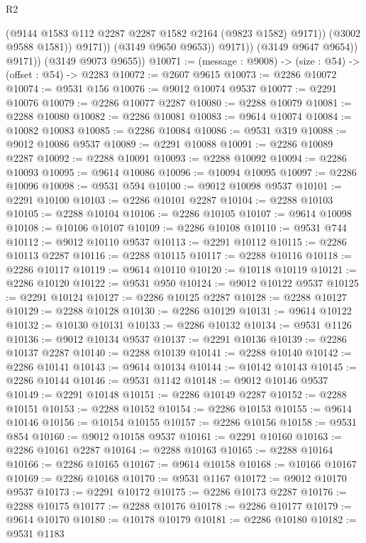 \begin{lexlean}{R2}
\begin{coremodule}
                          (@9144 @1583 @112 @2287 @2287 @1582 @2164 (@9823 @1582) @9171))
                        (@3002 @9588 @1581))
                      @9171))
                  (@3149 @9650 @9653))
                @9171))
            (@3149 @9647 @9654))
          @9171))
      (@3149 @9073 @9655))
@10071 := (message : @9008) -> (size : @54) -> (offset : @54) -> @2283
@10072 := @2607 @9615
@10073 := @2286 @10072
@10074 := @9531 @156
@10076 := @9012 @10074 @9537
@10077 := @2291 @10076
@10079 := @2286 @10077 @2287
@10080 := @2288 @10079
@10081 := @2288 @10080
@10082 := @2286 @10081
@10083 := @9614 @10074
@10084 := @10082 @10083
@10085 := @2286 @10084
@10086 := @9531 @319
@10088 := @9012 @10086 @9537
@10089 := @2291 @10088
@10091 := @2286 @10089 @2287
@10092 := @2288 @10091
@10093 := @2288 @10092
@10094 := @2286 @10093
@10095 := @9614 @10086
@10096 := @10094 @10095
@10097 := @2286 @10096
@10098 := @9531 @594
@10100 := @9012 @10098 @9537
@10101 := @2291 @10100
@10103 := @2286 @10101 @2287
@10104 := @2288 @10103
@10105 := @2288 @10104
@10106 := @2286 @10105
@10107 := @9614 @10098
@10108 := @10106 @10107
@10109 := @2286 @10108
@10110 := @9531 @744
@10112 := @9012 @10110 @9537
@10113 := @2291 @10112
@10115 := @2286 @10113 @2287
@10116 := @2288 @10115
@10117 := @2288 @10116
@10118 := @2286 @10117
@10119 := @9614 @10110
@10120 := @10118 @10119
@10121 := @2286 @10120
@10122 := @9531 @950
@10124 := @9012 @10122 @9537
@10125 := @2291 @10124
@10127 := @2286 @10125 @2287
@10128 := @2288 @10127
@10129 := @2288 @10128
@10130 := @2286 @10129
@10131 := @9614 @10122
@10132 := @10130 @10131
@10133 := @2286 @10132
@10134 := @9531 @1126
@10136 := @9012 @10134 @9537
@10137 := @2291 @10136
@10139 := @2286 @10137 @2287
@10140 := @2288 @10139
@10141 := @2288 @10140
@10142 := @2286 @10141
@10143 := @9614 @10134
@10144 := @10142 @10143
@10145 := @2286 @10144
@10146 := @9531 @1142
@10148 := @9012 @10146 @9537
@10149 := @2291 @10148
@10151 := @2286 @10149 @2287
@10152 := @2288 @10151
@10153 := @2288 @10152
@10154 := @2286 @10153
@10155 := @9614 @10146
@10156 := @10154 @10155
@10157 := @2286 @10156
@10158 := @9531 @854
@10160 := @9012 @10158 @9537
@10161 := @2291 @10160
@10163 := @2286 @10161 @2287
@10164 := @2288 @10163
@10165 := @2288 @10164
@10166 := @2286 @10165
@10167 := @9614 @10158
@10168 := @10166 @10167
@10169 := @2286 @10168
@10170 := @9531 @1167
@10172 := @9012 @10170 @9537
@10173 := @2291 @10172
@10175 := @2286 @10173 @2287
@10176 := @2288 @10175
@10177 := @2288 @10176
@10178 := @2286 @10177
@10179 := @9614 @10170
@10180 := @10178 @10179
@10181 := @2286 @10180
@10182 := @9531 @1183

\end{coremodule}
\end{lexlean}
